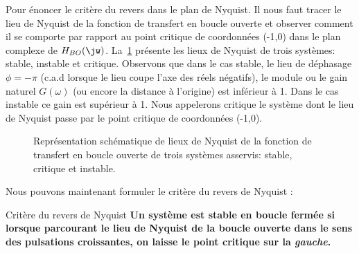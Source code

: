 Pour énoncer le critère du revers dans le plan de Nyquist. Il nous faut tracer
le lieu de Nyquist de la fonction de transfert en boucle ouverte et observer 
comment il se comporte par rapport au point critique de coordonnées (-1,0) 
dans le plan complexe de $H_{BO}(\jw)$. La~\cref{fig-nyquist_revers} présente 
les lieux de Nyquist de trois systèmes: stable, instable et critique. Observons
que dans le cas stable, le lieu de déphasage $\phi=-\pi$ (c.a.d lorsque le lieu
coupe l'axe des réels négatifs), le module ou le gain naturel $G(\omega)$ (ou 
encore la distance à l'origine) est inférieur à 1. Dans le cas instable ce gain 
est supérieur à 1. Nous appelerons critique le système dont le lieu de Nyquist 
passe par le point critique de coordonnées (-1,0).
\begin{figure}[!h]
    \centering
    
    \caption{Représentation schématique de lieux de Nyquist de la fonction 
             de transfert en boucle ouverte de trois systèmes asservis: 
             stable, critique et instable. \label{fig-nyquist_revers}}
\end{figure}
Nous pouvons maintenant formuler le critère du revers de Nyquist :
\begin{criteria}{Critère du revers de Nyquist}
\textbf{Un système est stable en boucle fermée si lorsque parcourant 
        le lieu de Nyquist de la boucle ouverte dans le sens des 
        pulsations croissantes, on laisse le point critique sur la 
        \emph{gauche}.}
\end{criteria}
